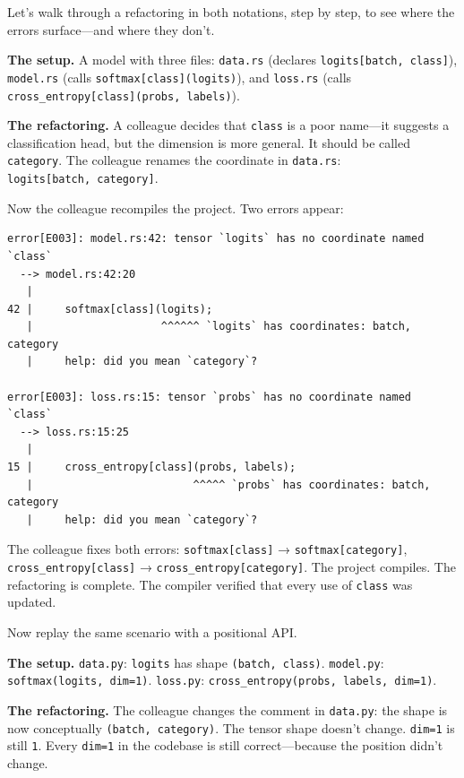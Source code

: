 \documentclass[11pt,titlepage]{article}
\begin{document}
Let's walk through a refactoring in both notations, step by step, to see
where the errors surface---and where they don't.

\textbf{The setup.} A model with three files: \texttt{data.rs} (declares
\texttt{logits{[}batch,\ class{]}}), \texttt{model.rs} (calls
\texttt{softmax{[}class{]}(logits)}), and \texttt{loss.rs} (calls
\texttt{cross\_entropy{[}class{]}(probs,\ labels)}).

\textbf{The refactoring.} A colleague decides that \texttt{class} is a
poor name---it suggests a classification head, but the dimension is more
general. It should be called \texttt{category}. The colleague renames
the coordinate in \texttt{data.rs}:
\texttt{logits{[}batch,\ category{]}}.

Now the colleague recompiles the project. Two errors appear:

\begin{verbatim}
error[E003]: model.rs:42: tensor `logits` has no coordinate named `class`
  --> model.rs:42:20
   |
42 |     softmax[class](logits);
   |                    ^^^^^^ `logits` has coordinates: batch, category
   |     help: did you mean `category`?

error[E003]: loss.rs:15: tensor `probs` has no coordinate named `class`
  --> loss.rs:15:25
   |
15 |     cross_entropy[class](probs, labels);
   |                         ^^^^^ `probs` has coordinates: batch, category
   |     help: did you mean `category`?
\end{verbatim}

The colleague fixes both errors: \texttt{softmax{[}class{]}} →
\texttt{softmax{[}category{]}}, \texttt{cross\_entropy{[}class{]}} →
\texttt{cross\_entropy{[}category{]}}. The project compiles. The
refactoring is complete. The compiler verified that every use of
\texttt{class} was updated.

Now replay the same scenario with a positional API.

\textbf{The setup.} \texttt{data.py}: \texttt{logits} has shape
\texttt{(batch,\ class)}. \texttt{model.py}:
\texttt{softmax(logits,\ dim=1)}. \texttt{loss.py}:
\texttt{cross\_entropy(probs,\ labels,\ dim=1)}.

\textbf{The refactoring.} The colleague changes the comment in
\texttt{data.py}: the shape is now conceptually
\texttt{(batch,\ category)}. The tensor shape doesn't change.
\texttt{dim=1} is still \texttt{1}. Every \texttt{dim=1} in the codebase
is still correct---because the position didn't change.
\end{document}
